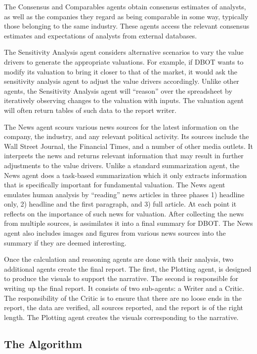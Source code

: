 \documentclass[]{interact}
\theoremstyle{plain}%
\theoremstyle{definition}
\theoremstyle{remark}
\begin{document}
The Consensus and Comparables agents obtain consensus estimates of analysts, as well as the companies they regard as being comparable in some way, typically those belonging to the same industry. These agents access the relevant consensus estimates and expectations of analysts from external databases. 

The Sensitivity Analysis agent considers alternative scenarios to vary the value drivers to generate the appropriate valuations. For example, if DBOT wants to modify its valuation to bring it closer to that  of the market, it would ask the sensitivity analysis agent to adjust the value drivers accordingly. Unlike other agents, the Sensitivity Analysis agent will ``reason'' over the spreadsheet by iteratively observing changes to the valuation with inputs. The valuation agent will often return tables of such data to the report writer. 

The News agent scours various news sources for the latest information on the company, the industry, and any relevant political activity. Its sources include the Wall Street Journal, the Financial Times, and a number of other media outlets. It interprets the news and returns relevant information that may result in further adjustments to the value drivers. Unlike a standard summarization agent, the News agent does a task-based summarization which it only extracts information that is specifically important for fundamental valuation. The News agent emulates human analysis by ``reading'' news articles in three phases 1) headline only, 2) headline and the first paragraph, and 3) full article. At each point it reflects on the importance of such news for valuation. After collecting the news from multiple sources, is assimilates it into a final summary for DBOT. The News agent also includes images and figures from various news sources into the summary if they are deemed interesting.

Once the calculation and reasoning agents are done with their analysis, two additional agents create the final report. The first, the Plotting agent, is designed to produce the visuals to support the narrative. The second is responsible for writing up the final report. It consists of two sub-agents: a Writer and a Critic. The responsibility of the Critic is to ensure that there are no loose ends in the report, the data are verified, all sources reported, and the report is of the right length. The Plotting agent creates the visuals corresponding to the narrative.

\subsection{The Algorithm}
\end{document}
